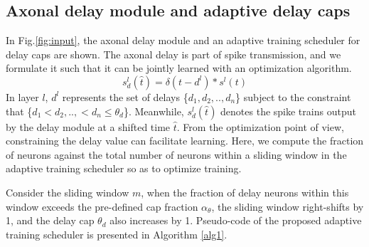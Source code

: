 \documentclass{article}
\begin{document}
\subsection{Axonal delay module and adaptive delay caps}\label{sec:2}
In Fig.\ref{fig:input}, the axonal delay module and an adaptive training scheduler for delay caps are shown. The axonal delay is part of spike transmission, and we formulate it such that it can be jointly learned  with an optimization algorithm. 
\begin{equation}
            s_{d}^{l}(\hat{t}) = \delta(t-{d^{l}}) * s^{l}(t)
\end{equation}
In layer $l$, $d^{l}$ represents the set of delays \{${d_{1},d_{2},..,d_{n}}$\} subject to the constraint that \{${d_{1}<d_{2},..,<d_{n}\leq \theta_d}$\}. Meanwhile, $s_{d}^{l}(\hat{t})$ denotes the spike trains output by the delay module at a shifted time $\hat{t}$. From the optimization point of view, constraining the delay value can facilitate learning. Here, we compute the fraction of neurons against the total number of neurons within a sliding window \cite{niu2019comparison} in the adaptive training scheduler so as to optimize training. 

Consider the sliding window $m$, when the fraction of delay neurons within this window exceeds the pre-defined cap fraction $\alpha_{\theta}$, the sliding window right-shifts by 1, and the delay cap $\theta_{d}$ also increases by 1. Pseudo-code of the proposed adaptive training scheduler is presented in Algorithm \ref{alg1}. 
\end{document}
